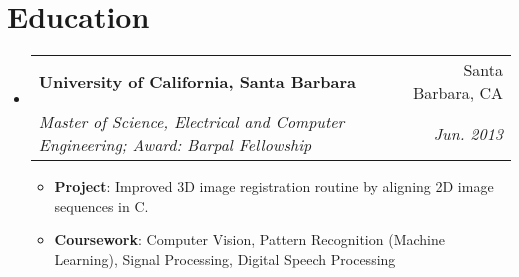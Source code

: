\documentclass[letterpaper,12pt]{article}
\makeatletter
\newcommand{\resumeItem}[2]{
  \item\small{
    \textbf{#1}{: #2 \vspace{-2pt}}
  }
}
\newcommand{\resumeSubheading}[4]{
  \vspace{-1pt}\item
    \begin{tabular*}{0.97\textwidth}{l@{\extracolsep{\fill}}r}
      \textbf{#1} & #2 \\
      \textit{\small#3} & \textit{\small #4} \\
    \end{tabular*}\vspace{-5pt}
}
\newcommand{\resumeSubHeadingListStart}{\begin{itemize}[leftmargin=*]}
\newcommand{\resumeSubHeadingListEnd}{\end{itemize}}
\newcommand{\resumeItemListStart}{\begin{itemize}}
\newcommand{\resumeItemListEnd}{\end{itemize}\vspace{-5pt}}
\makeatother
\begin{document}
\section{Education}
  \resumeSubHeadingListStart
    \resumeSubheading
      {University of California, Santa Barbara}{Santa Barbara, CA}
      {Master of Science, Electrical and Computer Engineering; Award: Barpal Fellowship}{Jun. 2013}
    \resumeItemListStart
        \resumeItem{Project}
          {Improved 3D image registration routine by aligning 2D image sequences in C.}
        \resumeItem{Coursework}
          {Computer Vision, Pattern Recognition (Machine Learning), Signal Processing, Digital Speech Processing}
     \resumeItemListEnd
  \resumeSubHeadingListEnd
\end{document}
